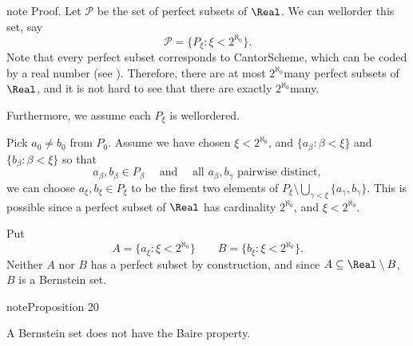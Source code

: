 \documentclass[letterpaper,10pt,english]{jupyterBook}
\begin{document}
\begin{sphinxadmonition}{note}
\sphinxAtStartPar
Proof. Let \(\mathcal{P}\) be the set of perfect subsets of \(\Real\). We can well\sphinxhyphen{}order this set, say
\begin{equation*}
    \mathcal{P} = \{P_\xi \colon \xi < 2^{\aleph_0} \}.
\end{equation*}
\sphinxAtStartPar
Note that every perfect subset corresponds to Cantor\sphinxhyphen{}Scheme, which can be coded by a real number (see {\hyperref[\detokenize{perfect_subsets_R:ch-perfect}]{}}). Therefore, there are at most \(2^{\aleph_0}\)\sphinxhyphen{}many perfect subsets of \(\Real\), and it is not hard to see that there are exactly \(2^{\aleph_0}\)\sphinxhyphen{}many.

\sphinxAtStartPar
Furthermore, we assume each \(P_\xi\) is well\sphinxhyphen{}ordered.

\sphinxAtStartPar
Pick \(a_0 \neq b_0\) from \(P_0\). Assume we have chosen \(\xi < 2^{\aleph_0}\), and \(\{a_\beta\colon \beta < \xi \}\) and \(\{b_\beta\colon \beta < \xi \}\) so that
\begin{equation*}
    a_\beta, b_\beta \in P_\beta \quad \text{ and } \quad \text{all $a_\beta, b_\gamma$ pairwise distinct},
\end{equation*}
\sphinxAtStartPar
we can choose \(a_\xi, b_\xi \in P_\xi\) to be the first two elements of \(P_\xi \setminus \bigcup_{\gamma < \xi} \{a_\gamma, b_\gamma\}\). This is possible since a perfect subset of \(\Real\) has cardinality \(2^{\aleph_0}\), and \(\xi< 2^{\aleph_0}\).

\sphinxAtStartPar
Put
\begin{equation*}
        A = \{a_\xi \colon \xi < 2^{\aleph_0} \} \qquad B = \{b_\xi \colon \xi < 2^{\aleph_0} \}.
\end{equation*}
\sphinxAtStartPar
Neither \(A\) nor \(B\) has a perfect subset by construction, and since \(A \subseteq \Real\setminus B\), \(B\) is a Bernstein set.
\end{sphinxadmonition}
\label{choice:prop-Bernstein-BP}
\begin{sphinxadmonition}{note}{Proposition 20}



\sphinxAtStartPar
A Bernstein set does not have the Baire property.
\end{sphinxadmonition}
\end{document}

